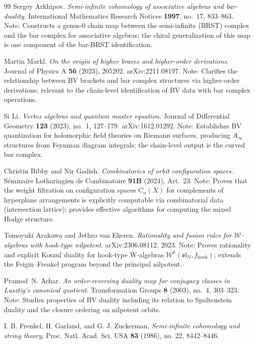 \begin{thebibliography}{99}
Sergey Arkhipov.
\textit{Semi-infinite cohomology of associative algebras and bar-duality}.
International Mathematics Research Notices \textbf{1997}, no.~17, 833--863.
Note: Constructs a genus-$0$ chain map between the semi-infinite (BRST)
complex and the bar complex for associative algebras; the chiral
generalization of this map is one component of the bar-BRST identification.

Martin Markl.
\textit{On the origin of higher braces and higher-order derivations}.
Journal of Physics A \textbf{56} (2023), 205202.
arXiv:2211.08197.
Note: Clarifies the relationship between BV brackets and bar complex
structures via higher-order derivations; relevant to the chain-level
identification of BV data with bar complex operations.

Si Li.
\textit{Vertex algebras and quantum master equation}.
Journal of Differential Geometry \textbf{123} (2023), no.~1, 127--179.
arXiv:1612.01292.
Note: Establishes BV quantization for holomorphic field theories on
Riemann surfaces, producing $A_\infty$ structures from Feynman
diagram integrals; the chain-level output is the curved bar complex.


Christin Bibby and Nir Gadish.
\textit{Combinatorics of orbit configuration spaces}.
S\'eminaire Lotharingien de Combinatoire \textbf{91B} (2024), Art.~23.
Note: Proves that the weight filtration on configuration spaces
$C_n(X)$ for complements of hyperplane arrangements is explicitly
computable via combinatorial data (intersection lattice); provides
effective algorithms for computing the mixed Hodge structure.


Tomoyuki Arakawa and Jethro van Ekeren.
\textit{Rationality and fusion rules for $\mathcal{W}$-algebras with
hook-type nilpotent}.
arXiv:2306.08112, 2023.
Note: Proves rationality and explicit Koszul duality for hook-type
W-algebras $\mathcal{W}^k(\mathfrak{sl}_N, f_{\mathrm{hook}})$;
extends the Feigin--Frenkel program beyond the principal nilpotent.


Pramod~N. Achar.
\textit{An order-reversing duality map for conjugacy classes in
Lusztig's canonical quotient}.
Transformation Groups \textbf{8} (2003), no.~4, 303--323.
Note: Studies properties of BV duality including its relation
to Spaltenstein duality and the closure ordering on nilpotent orbits.

 I. B. Frenkel, H. Garland, and G. J. Zuckerman, \emph{Semi-infinite cohomology and string theory}, Proc. Natl. Acad. Sci. USA \textbf{83} (1986), no. 22, 8442--8446.


\end{thebibliography}
